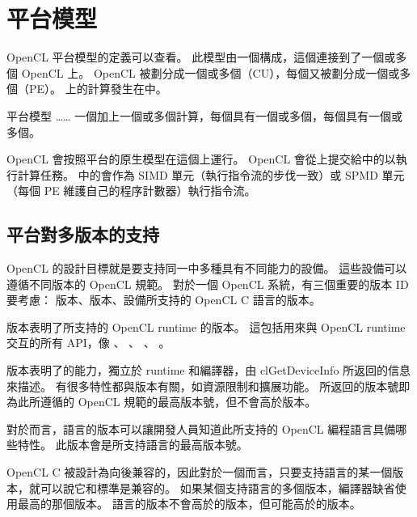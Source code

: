 \section{平台模型}

OpenCL 平台模型的定義可以查看。
此模型由一個構成，這個連接到了一個或多個 {\ftEmp OpenCL} 上。
OpenCL 被劃分成一個或多個（CU），每個又被劃分成一個或多個（PE）。
上的計算發生在中。

\startbuffer[buffigplfmodelcaption]
平台模型 …… 一個加上一個或多個計算，每個具有一個或多個，每個具有一個或多個。
\stopbuffer
{}
{}

OpenCL 會按照平台的原生模型在這個上運行。
OpenCL 會從上提交給中的以執行計算任務。
中的會作為 SIMD 單元（執行指令流的步伐一致）或 SPMD 單元（每個 PE 維護自己的程序計數器）執行指令流。

\subsection{平台對多版本的支持}
OpenCL 的設計目標就是要支持同一中多種具有不同能力的設備。
這些設備可以遵循不同版本的 OpenCL 規範。
對於一個 OpenCL 系統，有三個重要的版本 ID 要考慮：
版本、版本、設備所支持的 OpenCL C 語言的版本。

版本表明了所支持的 OpenCL runtime 的版本。
這包括用來與 OpenCL runtime 交互的所有 API，像 、 、 、 。

版本表明了的能力，獨立於 runtime 和編譯器，由 {\ftCEmpha clGetDeviceInfo} 所返回的信息來描述。
有很多特性都與版本有關，如資源限制和擴展功能。
所返回的版本號即為此所遵循的 OpenCL 規範的最高版本號，但不會高於版本。

對於而言，語言的版本可以讓開發人員知道此所支持的 OpenCL 編程語言具備哪些特性。
此版本會是所支持語言的最高版本號。

OpenCL C 被設計為向後兼容的，因此對於一個而言，只要支持語言的某一個版本，就可以說它和標準是兼容的。
如果某個支持語言的多個版本，編譯器缺省使用最高的那個版本。
語言的版本不會高於的版本，但可能高於的版本。

